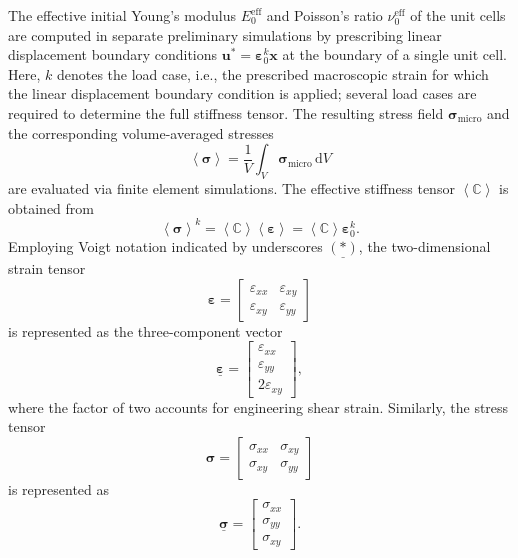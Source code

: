 \documentclass[pdflatex,sn-mathphys-num]{sn-jnl}%
\theoremstyle{thmstyleone}%
\theoremstyle{thmstyletwo}%
\theoremstyle{thmstylethree}%
\begin{document}
The effective initial Young’s modulus $E_0^{\text{eff}}$ and Poisson’s ratio $\nu_0^{\text{eff}}$ of the unit cells are computed in separate preliminary simulations by prescribing linear displacement boundary conditions $\boldsymbol{u}^* = \boldsymbol{\varepsilon}_0^k \boldsymbol{x}$ at the boundary of a single unit cell.
Here, $k$ denotes the load case, i.e., the prescribed macroscopic strain for which the linear displacement boundary condition is applied; several load cases are required to determine the full stiffness tensor.
The resulting stress field $\boldsymbol{\sigma}_{\text{micro}}$ and the corresponding volume-averaged stresses
\begin{equation}
    \left< \boldsymbol{\sigma} \right> = \dfrac{1}{V} \int_V \boldsymbol{\sigma}_{\text{micro}} \, \mathrm{d}V
\end{equation}
are evaluated via finite element simulations. The effective stiffness tensor $\left< \boldsymbol{\mathbb{C}} \right>$ is obtained from
\begin{equation}
    \left< \boldsymbol{\sigma} \right>^k = \left< \boldsymbol{\mathbb{C}} \right>  \left< \boldsymbol{\varepsilon} \right> = \left< \boldsymbol{\mathbb{C}} \right>  \boldsymbol{\varepsilon}_0^k.
\end{equation}
Employing Voigt notation indicated by underscores $\underline{(*)}$, the two-dimensional strain tensor
\[
\boldsymbol{\varepsilon} = 
\begin{bmatrix} \varepsilon_{xx} & \varepsilon_{xy} \\ \varepsilon_{xy} & \varepsilon_{yy} \end{bmatrix}
\]
is represented as the three-component vector
\begin{equation}
\underline{\boldsymbol{\varepsilon}} = 
\begin{bmatrix} \varepsilon_{xx} \\ \varepsilon_{yy} \\ 2 \varepsilon_{xy} \end{bmatrix},
\end{equation}
where the factor of two accounts for engineering shear strain. Similarly, the stress tensor
\[
\boldsymbol{\sigma} = 
\begin{bmatrix} \sigma_{xx} & \sigma_{xy} \\ \sigma_{xy} & \sigma_{yy} \end{bmatrix}
\]
is represented as
\begin{equation}
\underline{\boldsymbol{\sigma}} = 
\begin{bmatrix} \sigma_{xx} \\ \sigma_{yy} \\ \sigma_{xy} \end{bmatrix}.
\end{equation}
\end{document}
